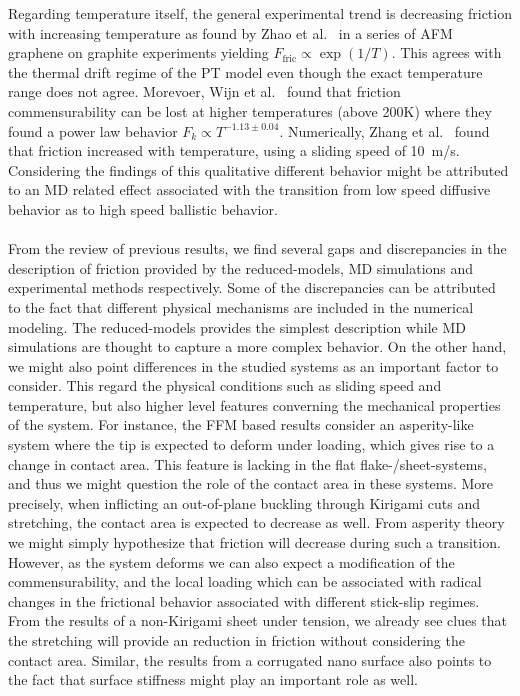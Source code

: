 Regarding temperature itself, the general experimental trend is decreasing friction with increasing temperature as found by Zhao et al.\ \cite{zhao_thermally_2007} in a series of \acrshort{AFM} graphene on graphite experiments yielding $F_{\text{fric}} \propto \exp{(1/T)}$. This agrees with the thermal drift regime of the \acrshort{PT} model even though the exact temperature range does not agree. Morevoer, Wijn et al.\ \cite{Wijn_2011} found that friction commensurability can be lost at higher temperatures (above 200K) where they found a power law behavior $F_k \propto T^{-1.13 \pm0.04}$. Numerically, Zhang et al.\ \cite{ma12091425} found that friction increased with temperature, using a sliding speed of \SI{10}{m/s}. Considering the findings of \cite{Guerra_2010} this qualitative different behavior might be attributed to an \acrshort{MD} related effect associated with the transition from low speed diffusive behavior as to high speed ballistic behavior.
\\
\\
From the review of previous results, we find several gaps and discrepancies in
the description of friction provided by the reduced-models, \acrshort{MD}
simulations and experimental methods respectively. Some of the discrepancies can
be attributed to the fact that different physical mechanisms are included in the
numerical modeling. The reduced-models provides the simplest description while
\acrshort{MD} simulations are thought to capture a more complex behavior. On the
other hand, we might also point differences in the studied systems as an
important factor to consider. This regard the physical conditions such as
sliding speed and temperature, but also higher level features converning the
mechanical properties of the system. For instance, the \acrshort{FFM} based
results consider an asperity-like system where the tip is expected to deform
under loading, which gives rise to a change in contact area. This feature is
lacking in the flat flake-/sheet-systems, and thus we might question the role of
the contact area in these systems. More precisely, when inflicting an
out-of-plane buckling through Kirigami cuts and stretching, the contact area is
expected to decrease as well. From asperity theory we might simply hypothesize
that friction will decrease during such a transition. However, as the system
deforms we can also expect a modification of the commensurability, and the local loading which can be associated with radical changes in the frictional behavior associated with different stick-slip regimes. From the results of a non-Kirigami sheet under tension, we already see clues that the stretching will provide an reduction in friction without considering the contact area. Similar, the results from a corrugated nano surface also points to the fact that surface stiffness might play an important role as well. 








